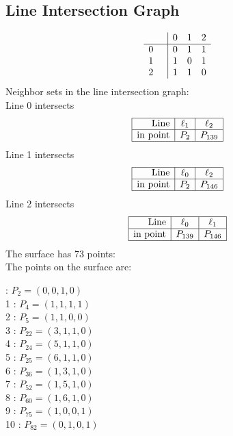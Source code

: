 \documentclass{article}
\begin{document}
{\subsection*{Line Intersection Graph}
{\arraycolsep=1pt
$$
\begin{array}{rr|*{3}r}
 &  & 0 & 1 & 2\\
\hline
0 &  & 0 & 1 & 1\\
1 &  & 1 & 0 & 1\\
2 &  & 1 & 1 & 0\\
\end{array}
$$
}%
Neighbor sets in the line intersection graph:\\
Line 0 intersects 
$$
\begin{array}{|r*{2}{|c}|}
\hline
\mbox{Line}  & \ell_{1} & \ell_{2}\\
\hline
\mbox{in point}  & P_{2} & P_{139}\\
\hline
\end{array}
$$
Line 1 intersects 
$$
\begin{array}{|r*{2}{|c}|}
\hline
\mbox{Line}  & \ell_{0} & \ell_{2}\\
\hline
\mbox{in point}  & P_{2} & P_{146}\\
\hline
\end{array}
$$
Line 2 intersects 
$$
\begin{array}{|r*{2}{|c}|}
\hline
\mbox{Line}  & \ell_{0} & \ell_{1}\\
\hline
\mbox{in point}  & P_{139} & P_{146}\\
\hline
\end{array}
$$
The surface has 73 points:\\
The points on the surface are:\\
\begin{multicols}{3}
 : $P_{2}=( 0, 0, 1, 0 )$\\
1 : $P_{4}=( 1, 1, 1, 1 )$\\
2 : $P_{5}=( 1, 1, 0, 0 )$\\
3 : $P_{22}=( 3, 1, 1, 0 )$\\
4 : $P_{24}=( 5, 1, 1, 0 )$\\
5 : $P_{25}=( 6, 1, 1, 0 )$\\
6 : $P_{36}=( 1, 3, 1, 0 )$\\
7 : $P_{52}=( 1, 5, 1, 0 )$\\
8 : $P_{60}=( 1, 6, 1, 0 )$\\
9 : $P_{75}=( 1, 0, 0, 1 )$\\
10 : $P_{82}=( 0, 1, 0, 1 )$\\

\end{multicols}}
\end{document}
